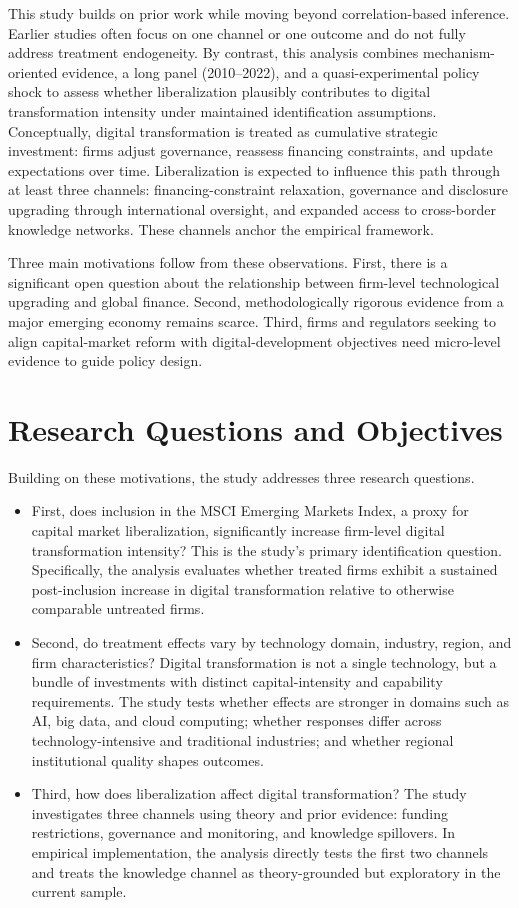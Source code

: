 This study builds on prior work while moving beyond correlation-based inference. Earlier studies often focus on one channel or one outcome and do not fully address treatment endogeneity. By contrast, this analysis combines mechanism-oriented evidence, a long panel (2010--2022), and a quasi-experimental policy shock to assess whether liberalization plausibly contributes to digital transformation intensity under maintained identification assumptions. Conceptually, digital transformation is treated as cumulative strategic investment: firms adjust governance, reassess financing constraints, and update expectations over time. Liberalization is expected to influence this path through at least three channels: financing-constraint relaxation, governance and disclosure upgrading through international oversight, and expanded access to cross-border knowledge networks. These channels anchor the empirical framework.

Three main motivations follow from these observations. First, there is a significant open question about the relationship between firm-level technological upgrading and global finance. Second, methodologically rigorous evidence from a major emerging economy remains scarce. Third, firms and regulators seeking to align capital-market reform with digital-development objectives need micro-level evidence to guide policy design.

\section{Research Questions and Objectives}

Building on these motivations, the study addresses three research questions.

\begin{itemize}
    \item First, does inclusion in the MSCI Emerging Markets Index, a proxy for capital market liberalization, significantly increase firm-level digital transformation intensity? This is the study's primary identification question. Specifically, the analysis evaluates whether treated firms exhibit a sustained post-inclusion increase in digital transformation relative to otherwise comparable untreated firms.
    \item Second, do treatment effects vary by technology domain, industry, region, and firm characteristics? Digital transformation is not a single technology, but a bundle of investments with distinct capital-intensity and capability requirements. The study tests whether effects are stronger in domains such as AI, big data, and cloud computing; whether responses differ across technology-intensive and traditional industries; and whether regional institutional quality shapes outcomes.
    \item Third, how does liberalization affect digital transformation? The study investigates three channels using theory and prior evidence: funding restrictions, governance and monitoring, and knowledge spillovers. In empirical implementation, the analysis directly tests the first two channels and treats the knowledge channel as theory-grounded but exploratory in the current sample.
\end{itemize}

